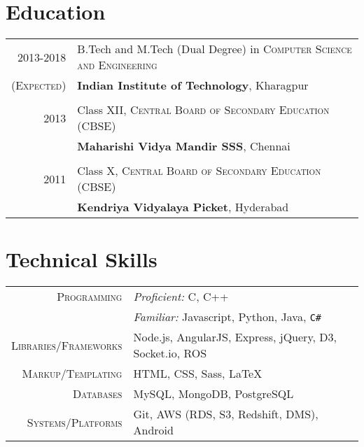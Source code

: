 \documentclass[a4paper,10pt]{extarticle} %
\begin{document}
\section{Education}

\begin{tabular}{r|p{16cm}}	
2013-2018 & B.Tech and M.Tech (Dual Degree) in \textsc{Computer Science and Engineering}\\
\textsc{(Expected)}&\textbf{Indian Institute of Technology}, Kharagpur\\
&\\


2013& Class XII, \textsc{}\textsc{Central Board of Secondary Education (CBSE)} \\
&\normalsize\textbf{Maharishi Vidya Mandir SSS}, Chennai\\
&\\


2011 & Class X, \textsc{}\textsc{Central Board of Secondary Education (CBSE)} \\
&\normalsize\textbf{Kendriya Vidyalaya Picket}, Hyderabad\\

\end{tabular}


\section{Technical Skills}

\begin{tabular}{r|p{16cm}}
\textsc{Programming} & {\itshape{Proficient:}} C, C++\\
& {\itshape{Familiar:}} Javascript, Python, Java, \verb!C#! \\
\textsc{Libraries/Frameworks} & Node.js, AngularJS, Express, jQuery, D3, Socket.io, ROS\\
\textsc{Markup/Templating} & HTML, CSS, Sass, \LaTeX\\
\textsc{Databases} & MySQL, MongoDB, PostgreSQL\\
\textsc{Systems/Platforms} & Git, AWS (RDS, S3, Redshift, DMS), Android\\
\end{tabular}
\end{document}
